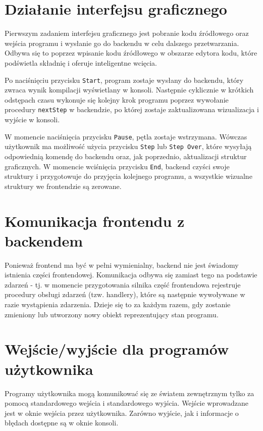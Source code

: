\documentclass[a4paper,twoside,openright,11pt]{report}
\begin{document}
  \section{Działanie interfejsu graficznego}
\par Pierwszym zadaniem interfejsu graficznego jest pobranie kodu źródłowego oraz wejścia programu i wysłanie go do backendu w celu dalszego przetwarzania. Odbywa się to poprzez wpisanie kodu źródłowego w obszarze edytora kodu, które podświetla składnię i oferuje inteligentne wcięcia.
\par Po naciśnięciu przycisku \texttt{Start}, program zostaje wysłany do backendu, który zwraca wynik kompilacji wyświetlany w konsoli. Następnie cyklicznie w krótkich odstępach czasu wykonuje się kolejny krok programu poprzez wywołanie procedury \texttt{nextStep} w backendzie, po której zostaje zaktualizowana wizualizacja i wyjście w konsoli.
\par W momencie naciśnięcia przycisku \texttt{Pause}, pętla zostaje wstrzymana. Wówczas użytkownik ma możliwość użycia przycisku \texttt{Step} lub \texttt{Step Over}, które wysyłają odpowiednią komendę do backendu oraz, jak poprzednio, aktualizacji struktur graficznych. W momencie wciśnięcia przycisku \texttt{End}, backend czyści swoje struktury i przygotowuje do przyjęcia kolejnego programu, a wszystkie wizualne struktury we frontendzie są zerowane.

  \section{Komunikacja frontendu z backendem}
\par Ponieważ frontend ma być w pełni wymienialny, backend nie jest świadomy istnienia części frontendowej. Komunikacja odbywa się zamiast tego na podstawie zdarzeń - tj. w momencie
przygotowania silnika część frontendowa rejestruje procedury obsługi zdarzeń (tzw. handlery), które są następnie wywoływane w razie wystąpienia zdarzenia. Dzieje się to za każdym razem, gdy zostanie zmieniony lub utworzony nowy obiekt reprezentujący stan programu.

  \section {Wejście/wyjście dla programów użytkownika}
  \par Programy użytkownika mogą komunikować się ze światem zewnętrznym tylko za pomocą standardowego wejścia i standardowego wyjścia. Wejście wprowadzane jest w oknie wejścia przez użytkownika. Zarówno wyjście, jak i informacje o błędach dostępne są w oknie konsoli.
\end{document}
